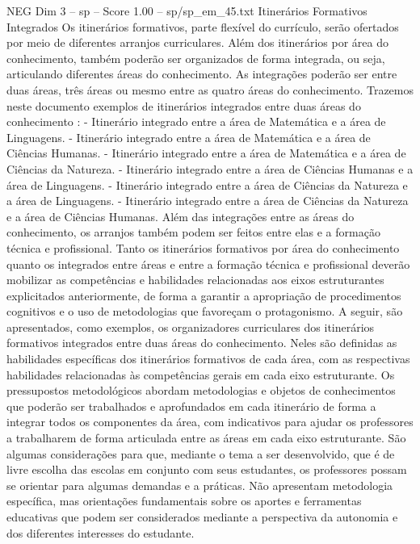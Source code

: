 \begin{textsample}{NEG Dim 3 – sp – Score 1.00 – sp/sp\_em\_45.txt}  \label{ex:f3_neg_081}
Itinerários Formativos Integrados Os itinerários formativos, parte flexível do currículo, serão ofertados por meio de diferentes arranjos curriculares.
Além dos itinerários por área do conhecimento, também poderão ser organizados de forma integrada, ou seja, articulando diferentes áreas do conhecimento.
As integrações poderão ser entre duas áreas, três áreas ou mesmo entre as quatro áreas do conhecimento.
Trazemos neste documento exemplos de itinerários integrados entre duas áreas do conhecimento : - Itinerário integrado entre a área de Matemática e a área de Linguagens. - Itinerário integrado entre a área de Matemática e a área de Ciências Humanas. - Itinerário integrado entre a área de Matemática e a área de Ciências da Natureza. - Itinerário integrado entre a área de Ciências Humanas e a área de Linguagens. - Itinerário integrado entre a área de Ciências da Natureza e a área de Linguagens. - Itinerário integrado entre a área de Ciências da Natureza e a área de Ciências Humanas.
Além das integrações entre as áreas do conhecimento, os arranjos também podem ser feitos entre elas e a formação técnica e profissional.
Tanto os itinerários formativos por área do conhecimento quanto os integrados entre áreas e entre a formação técnica e profissional deverão mobilizar as competências e habilidades relacionadas aos eixos estruturantes explicitados anteriormente, de forma a garantir a apropriação de procedimentos cognitivos e o uso de metodologias que favoreçam o protagonismo.
A seguir, são apresentados, como exemplos, os organizadores curriculares dos itinerários formativos integrados entre duas áreas do conhecimento.
Neles são definidas as habilidades específicas dos itinerários formativos de cada área, com as respectivas habilidades relacionadas às competências gerais em cada eixo estruturante.
Os pressupostos metodológicos abordam metodologias e objetos de conhecimentos que poderão ser trabalhados e aprofundados em cada itinerário de forma a integrar todos os componentes da área, com indicativos para ajudar os professores a trabalharem de forma articulada entre as áreas em cada eixo estruturante.
São algumas considerações para que, mediante o tema a ser desenvolvido, que é de livre escolha das escolas em conjunto com seus estudantes, os professores possam se orientar para algumas demandas e a práticas.
Não apresentam metodologia específica, mas orientações fundamentais sobre os aportes e ferramentas educativas que podem ser considerados mediante a perspectiva da autonomia e dos diferentes interesses do estudante.

\end{textsample}
